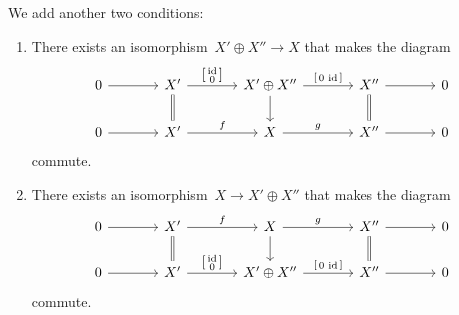 \section{}

We add another two conditions:

\begin{enumerate}[start=4,label=(\roman*)]
  \item
    There exists an isomorphism~$X' \oplus X'' \to X$ that makes the diagram
    \[
      \begin{tikzcd}[ampersand replacement = \&, column sep = large]
            0
            \arrow{r}
        \&  X'
            \arrow{r}[above]{\begin{bsmallmatrix} {\id} \\ 0 \end{bsmallmatrix}}
            \arrow[equal]{d}
        \&  X' \oplus X''
            \arrow{r}[above]{\begin{bsmallmatrix} 0 & {\id} \end{bsmallmatrix}}
            \arrow{d}
        \&  X''
            \arrow{r}
            \arrow[equal]{d}
        \&  0
        \\
            0
            \arrow{r}
        \&  X'
            \arrow{r}[above]{f}
        \&  X
            \arrow{r}[above]{g}
        \&  X''
            \arrow{r}
        \&  0
      \end{tikzcd}
    \]
    commute.
  \item
    There exists an isomorphism~$X \to X' \oplus X''$ that makes the diagram
    \[
      \begin{tikzcd}[ampersand replacement = \&, column sep = large]
            0
            \arrow{r}
        \&  X'
            \arrow{r}[above]{f}
            \arrow[equal]{d}
        \&  X
            \arrow{r}[above]{g}
            \arrow{d}
        \&  X''
            \arrow{r}
            \arrow[equal]{d}
        \&  0
        \\
            0
            \arrow{r}
        \&  X'
            \arrow{r}[above]{\begin{bsmallmatrix} {\id} \\ 0 \end{bsmallmatrix}}
        \&  X' \oplus X''
            \arrow{r}[above]{\begin{bsmallmatrix} 0 & {\id} \end{bsmallmatrix}}
        \&  X''
            \arrow{r}
        \&  0
      \end{tikzcd}
    \]
    commute.
\end{enumerate}





